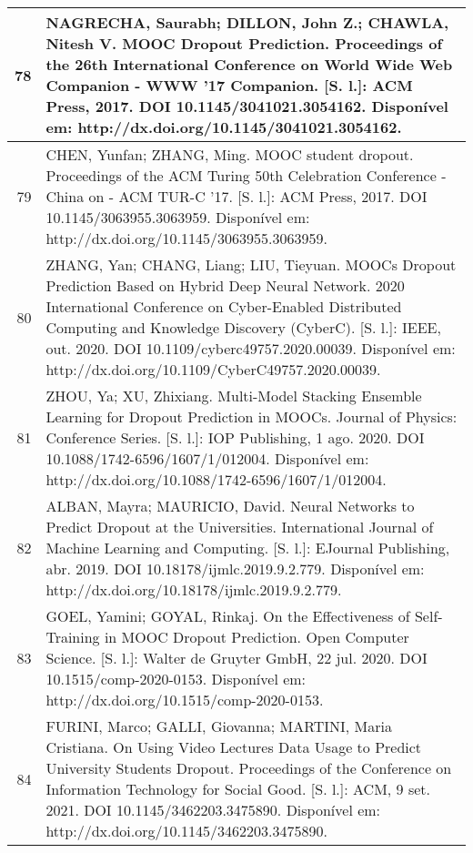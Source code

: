 \begin{apendicesenv}
\begin{longtable}[c]{|r|l|}
78 &
  \multicolumn{1}{p{14.5cm}|}{NAGRECHA, Saurabh; DILLON, John Z.; CHAWLA, Nitesh V. MOOC Dropout Prediction. Proceedings of the 26th International Conference on World Wide Web Companion - WWW ’17 Companion. {[}S. l.{]}: ACM Press, 2017. DOI 10.1145/3041021.3054162. Disponível em: http://dx.doi.org/10.1145/3041021.3054162.} \\ \hline
79 &
  \multicolumn{1}{p{14.5cm}|}{CHEN, Yunfan; ZHANG, Ming. MOOC student dropout. Proceedings of the ACM Turing 50th Celebration Conference - China on - ACM TUR-C ’17. {[}S. l.{]}: ACM Press, 2017. DOI 10.1145/3063955.3063959. Disponível em: http://dx.doi.org/10.1145/3063955.3063959.} \\ \hline
80 &
  \multicolumn{1}{p{14.5cm}|}{ZHANG, Yan; CHANG, Liang; LIU, Tieyuan. MOOCs Dropout Prediction Based on Hybrid Deep Neural Network. 2020 International Conference on Cyber-Enabled Distributed Computing and Knowledge Discovery (CyberC). {[}S. l.{]}: IEEE, out. 2020. DOI 10.1109/cyberc49757.2020.00039. Disponível em: http://dx.doi.org/10.1109/CyberC49757.2020.00039.} \\ \hline
81 &
  \multicolumn{1}{p{14.5cm}|}{ZHOU, Ya; XU, Zhixiang. Multi-Model Stacking Ensemble Learning for Dropout Prediction in MOOCs. Journal of Physics: Conference Series. {[}S. l.{]}: IOP Publishing, 1 ago. 2020. DOI 10.1088/1742-6596/1607/1/012004. Disponível em: http://dx.doi.org/10.1088/1742-6596/1607/1/012004.} \\ \hline
82 &
  \multicolumn{1}{p{14.5cm}|}{ALBAN, Mayra; MAURICIO, David. Neural Networks to Predict Dropout at the Universities. International Journal of Machine Learning and Computing. {[}S. l.{]}: EJournal Publishing, abr. 2019. DOI 10.18178/ijmlc.2019.9.2.779. Disponível em: http://dx.doi.org/10.18178/ijmlc.2019.9.2.779.} \\ \hline
83 &
  \multicolumn{1}{p{14.5cm}|}{GOEL, Yamini; GOYAL, Rinkaj. On the Effectiveness of Self-Training in MOOC Dropout Prediction. Open Computer Science. {[}S. l.{]}: Walter de Gruyter GmbH, 22 jul. 2020. DOI 10.1515/comp-2020-0153. Disponível em: http://dx.doi.org/10.1515/comp-2020-0153.} \\ \hline
84 &
  \multicolumn{1}{p{14.5cm}|}{FURINI, Marco; GALLI, Giovanna; MARTINI, Maria Cristiana. On Using Video Lectures Data Usage to Predict University Students Dropout. Proceedings of the Conference on Information Technology for Social Good. {[}S. l.{]}: ACM, 9 set. 2021. DOI 10.1145/3462203.3475890. Disponível em: http://dx.doi.org/10.1145/3462203.3475890.} \\ \hline

\end{longtable}
\end{apendicesenv}
